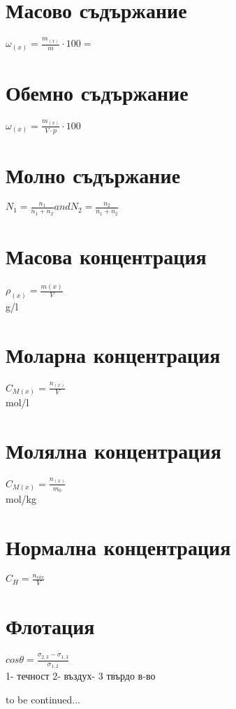 \documentclass[11pt]{Article}
\begin{document}
\section{Масово съдържание}
\begin{center}
{\Huge $\omega_{(x)} = \frac{m_{(x)}}{m}\cdot 100 = $}\\
\end{center}
\newpage

\section{Обемно съдържание}
\begin{center}
{\Huge $\omega_{(x)} = \frac{m_{(x)}}{V \cdot p} \cdot 100 $}\\
\end{center}
\newpage

\section{Молно съдържание}
\begin{center}
{\Huge $N_1 = \frac{n_1}{n_1 + n_2} and N_2 = \frac{n_2}{n_1 + n_2} $}\\
\end{center}
\newpage

\section{Масова концентрация}
\begin{center}
{\Huge $\rho_{(x)} = \frac{m{(x)}}{V} $}\\ g/l
\end{center}
\newpage

\section{Моларна концентрация}
\begin{center}
{\Huge $C_{M(x)} = \frac{n_{(x)}}{V}$}\\ mol/l
\end{center}
\newpage

\section{Молялна концентрация}
\begin{center}
{\Huge $C_{M(x)} = \frac{n_{(x)}}{m_0}$}\\ mol/kg
\end{center}
\newpage

\section{Нормална концентрация}
\begin{center}
{\Huge $C_H =\frac{n_{ekv}}{V}$}\\
\end{center}
\newpage

\section{Флотация}
{\Huge $cos\theta = \frac{\sigma_{2,3} - \sigma_{1,3} }{\sigma_{1,2}}$}\\ 1- течност 2- въздух- 3 твърдо в-во


to be continued...
\end{document}
